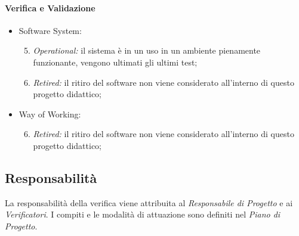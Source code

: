 	\paragraph{Verifica e Validazione}	
		\begin{itemize}
    		\item Software System:
    			\begin{enumerate}
    			\setcounter{enumi}{4}
    				\item \emph{Operational:} il sistema è in un uso in un ambiente pienamente funzionante, vengono ultimati gli ultimi test;
    				\item \emph{Retired:} il ritiro del software non viene considerato all'interno di questo progetto didattico;
    			\end{enumerate}
    		\item Way of Working:
    			\begin{enumerate}
    			\setcounter{enumi}{5}
    				\item \emph{Retired:}  il ritiro del software non viene considerato all'interno di questo progetto didattico;
    			\end{enumerate}
    	\end{itemize}
	
		
	\subsection{Responsabilità}
	La responsabilità della verifica viene attribuita al \emph{Responsabile di Progetto} e ai \emph{Verificatori}. I compiti e le modalità di attuazione sono definiti nel \emph{Piano di Progetto}.
	
